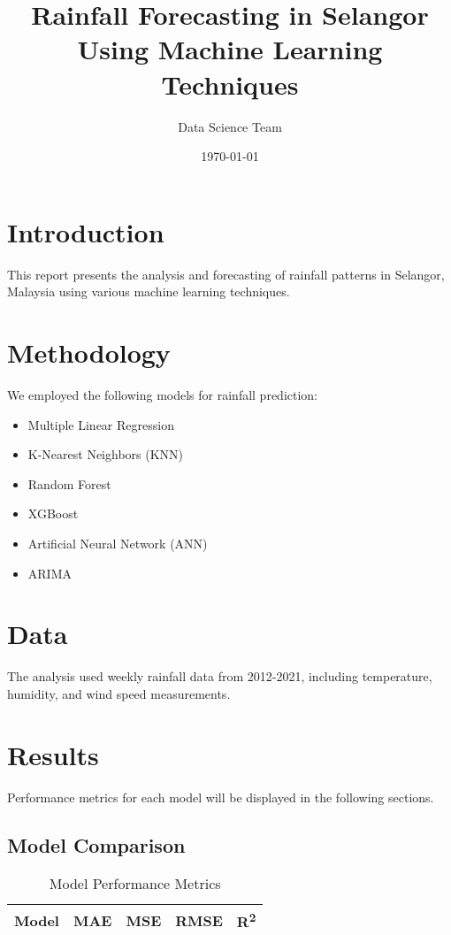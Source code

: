 \documentclass{article}
\title{Rainfall Forecasting in Selangor Using Machine Learning Techniques}
\author{Data Science Team}
\date{\today}
\begin{document}
\maketitle

\section{Introduction}
This report presents the analysis and forecasting of rainfall patterns in Selangor, Malaysia using various machine learning techniques. 

\section{Methodology}
We employed the following models for rainfall prediction:
\begin{itemize}
    \item Multiple Linear Regression
    \item K-Nearest Neighbors (KNN)
    \item Random Forest
    \item XGBoost
    \item Artificial Neural Network (ANN)
    \item ARIMA
\end{itemize}

\section{Data}
The analysis used weekly rainfall data from 2012-2021, including temperature, humidity, and wind speed measurements.

\section{Results}
Performance metrics for each model will be displayed in the following sections.

\subsection{Model Comparison}
\begin{table}[h]
\centering
\caption{Model Performance Metrics}
\label{tab:model_performance}
\begin{tabular}{l c c c c}
\toprule
Model & MAE & MSE & RMSE & R\textsuperscript{2} \\
\midrule
\bottomrule
\end{tabular}
\end{table}
\end{document}
